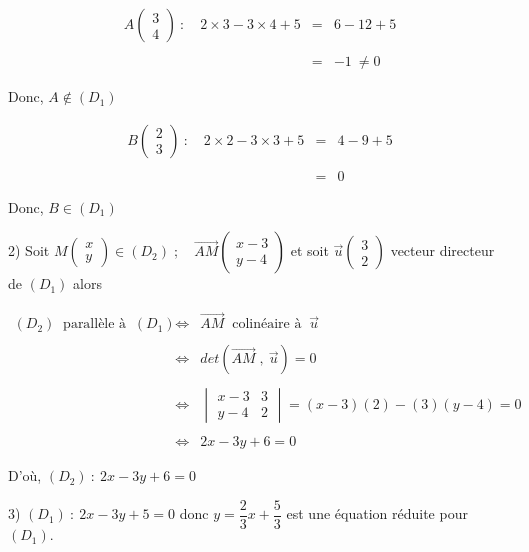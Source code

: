 \documentclass[12pt]{article}
\begin{document}
$$\begin{array}{rcl} A\begin{pmatrix} 3 \\ 4\end{pmatrix}\ :\quad 2\times 3-3\times 4+5&=&6-12+5\\ \\ &=&-1\ \neq 0\end{array}$$

Donc, $A\notin(D_{1})$

$$\begin{array}{rcl} B\begin{pmatrix} 2 \\ 3\end{pmatrix}\ :\quad 2\times 2-3\times 3+5&=&4-9+5\\ \\ &=&0\end{array}$$

Donc, $B\in(D_{1})$

2) Soit $M\begin{pmatrix} x \\ y\end{pmatrix}\in(D_{2})\;;\quad \overrightarrow{AM}\begin{pmatrix} x-3 \\ y-4\end{pmatrix}$ et soit $\vec{u}\begin{pmatrix} 3 \\ 2\end{pmatrix}$ vecteur directeur de $(D_{1})$ alors

$$\begin{array}{rcl} (D_{2})\ \text{ parallèle à }\ (D_{1})&\Leftrightarrow&\overrightarrow{AM}\ \text{ colinéaire à }\ \vec{u} \\ \\ &\Leftrightarrow&det(\overrightarrow{AM}\;,\ \vec{u})=0\\ \\ &\Leftrightarrow&\begin{vmatrix} x-3&3 \\ y-4&2\end{vmatrix}=(x-3)(2)-(3)(y-4)=0\\ \\ &\Leftrightarrow&2x-3y+6=0\end{array}$$

D'où, $(D_{2})\ :\ 2x-3y+6=0$

3) $(D_{1})\ :\ 2x-3y+5=0$ donc $y=\dfrac{2}{3}x+\dfrac{5}{3}$ est une équation réduite pour $(D_{1}).$
\end{document}
